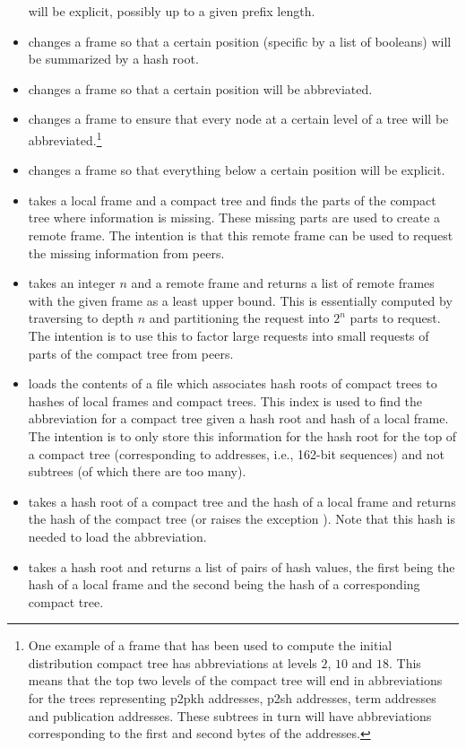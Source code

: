 \begin{itemize}
will be explicit, possibly up to a given prefix length.
\item {} changes a frame so that a certain position (specific by a list of booleans) will be summarized by a hash root.
\item {} changes a frame so that a certain position will be abbreviated.
\item {} changes a frame to ensure that every node at a certain
level of a tree will be abbreviated.\footnote{One example of a frame that has been used to compute the initial distribution compact tree has abbreviations at levels $2$, $10$ and $18$. This means that the top two levels of the compact tree will end in abbreviations for the trees representing p2pkh addresses, p2sh addresses, term addresses and publication addresses. These subtrees in turn will have abbreviations corresponding to the first and second bytes of the addresses.}
\item {} changes a frame so that everything below a certain position will be explicit.
\item {} takes a local frame and a compact tree
and finds the parts of the compact tree where information is missing.
These missing parts are used to create a remote frame.
The intention is that this remote frame can be used to request the missing
information from peers.
\item {} takes an integer $n$ and a remote frame
and returns a list of remote frames with the given frame as a least upper bound.
This is essentially computed by traversing to depth $n$ and partitioning the
request into $2^n$ parts to request.
The intention is to use this to factor large requests 
into small requests of parts of the compact tree from peers.
\item {} loads the contents of a file {}
which associates hash roots of compact trees
to hashes of local frames and compact trees.
This index is used to find the abbreviation for a compact tree given a hash root
and hash of a local frame.
The intention is to only store this information for the hash root for the top
of a compact tree (corresponding to addresses, i.e., 162-bit sequences)
and not subtrees (of which there are too many).
\item {} takes a hash root of a compact tree
and the hash of a local frame
and returns the hash of the compact tree
(or raises the exception {}).
Note that this hash is needed to load the abbreviation.
\item {} takes a hash root and returns a list of
pairs of hash values, the first being the hash of a local frame
and the second being the hash of a corresponding compact tree.
\end{itemize}

